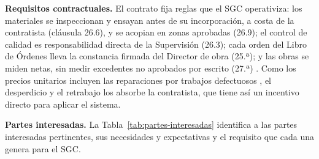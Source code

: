 \textbf{Requisitos contractuales.} El contrato fija reglas que el SGC operativiza: los materiales se inspeccionan y ensayan antes de su incorporación, a costa de la contratista (cláusula 26.6), y se acopian en zonas aprobadas (26.9); el control de calidad es responsabilidad directa de la Supervisión (26.3); cada orden del Libro de Órdenes lleva la constancia firmada del Director de obra (25.ª); y las obras se miden netas, sin medir excedentes no aprobados por escrito (27.ª) \parencite[pp.~99--102]{uatf2025pao2}. Como los precios unitarios incluyen las reparaciones por trabajos defectuosos \parencite[p.~92]{uatf2025pao2}, el desperdicio y el retrabajo los absorbe la contratista, que tiene así un incentivo directo para aplicar el sistema.

\textbf{Partes interesadas.} La Tabla~\ref{tab:partes-interesadas} identifica a las partes interesadas pertinentes, sus necesidades y expectativas y el requisito que cada una genera para el SGC.

